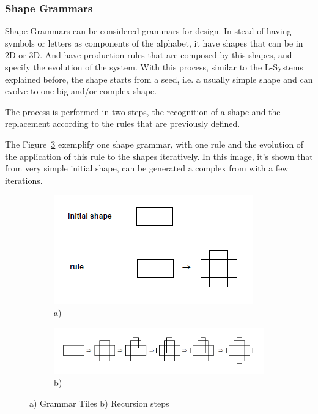 
\subsubsection{Shape Grammars} %
\label{ssub:shape_grammars}


Shape Grammars can be considered grammars for design. In stead of having symbols or letters as components of the alphabet, it have shapes that can be in 2D or 3D. And have production rules that are composed by this shapes, and specify the evolution of the system. With this process, similar to the L-Systems explained before, the shape starts from a seed, i.e. a usually simple shape and can evolve to one big and/or complex shape.

The process is performed in two steps, the recognition of a shape and the replacement according to the rules that are previously defined. 

The Figure~\ref{fig:SGrammars} exemplify one shape grammar, with one rule and the evolution of the application of this rule to the shapes iteratively. In this image, it's shown that from very simple initial shape, can be generated a complex from with a few iterations.

\begin{figure}
        \centering
		\begin{subfigure}[b]{0.7\textwidth}
			\includegraphics[width=\textwidth]{img/Theory/Shape_Grammars/Grammar.png}
			\caption{a)}
			\label{fig:SGGrammar}
		\end{subfigure}
        
		\begin{subfigure}[b]{0.7\textwidth}
			\includegraphics[width=\textwidth]{img/Theory/Shape_Grammars/Recursion.png}
			\caption{b)}
			\label{fig:SGRecursion}
		\end{subfigure}
        \caption{a) Grammar Tiles b) Recursion steps}
        \label{fig:SGrammars}
\end{figure}

